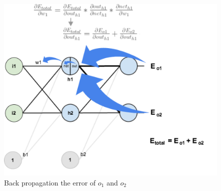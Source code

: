 \documentclass[master]{thesis-uestc}
\begin{document}
\begin{figure}[ht]
\includegraphics[width=5in]{pic/nn-calculation.png}
\caption{Back propagation the error of $o_1$ and $o_2$}
\label{fig_nn-calculation}
\end{figure}
\end{document}
